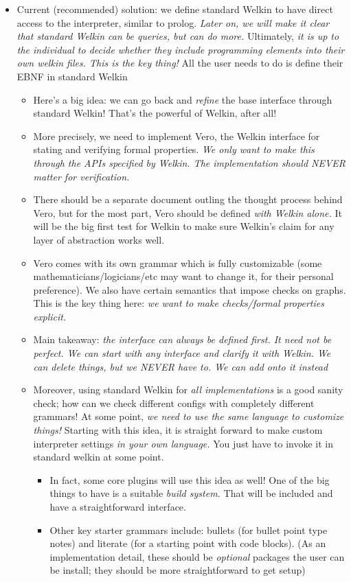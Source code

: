 \begin{itemize}
  \item Current (recommended) solution: we define standard Welkin to have direct access to the interpreter, similar to prolog. \textit{Later on, we will make it clear that standard Welkin can be queries, but can do more.} Ultimately, \textit{it is up to the individual to decide whether they include programming elements into their own welkin files. This is the key thing! } All the user needs to do is define their EBNF in standard Welkin
		\begin{itemize}
		  \item Here's a big idea: we can go back and \textit{refine} the base interface through standard Welkin! That's the powerful of Welkin, after all!
		  \item More precisely, we need to implement Vero, the Welkin interface for stating and verifying formal properties. \textit{We only want to make this through the APIs specified by Welkin. The implementation should NEVER matter for verification.}
		  \item There should be a separate document outling the thought process behind Vero, but for the most part, Vero should be defined \textit{with Welkin alone.} It will be the big first test for Welkin to make sure Welkin's claim for any layer of abstraction works well.
		\item Vero comes with its own grammar which is fully customizable (some mathematicians/logicians/etc may want to change it, for their personal preference). We also have certain semantics that impose checks on graphs. This is the key thing here: \textit{we want to make checks/formal properties explicit.}
		  \item Main takeaway: \textit{the interface can always be defined first. It need not be perfect. We can start with any interface and clarify it with Welkin. We can delete things, but we NEVER have to. We can add onto it instead}
		  \item Moreover, using standard Welkin for \textit{all implementations} is a good sanity check; how can we check different configs with completely different grammars! At some point, \textit{ we need to use the same language to customize things!} Starting with this idea, it is straight forward to make custom interpreter settings \textit{in your own language.} You just have to invoke it in standard welkin at some point.
				\begin{itemize}
				  \item In fact, some core plugins will use this idea as well! One of the big things to have is a suitable \textit{build system.} That will be included and have a straightforward interface.
				  \item Other key starter grammars include: bullets (for bullet point type notes) and literate (for a starting point with code blocks). (As an implementation detail, these should be \textit{optional} packages the user can be install; they should be more straightforward to get setup)
				\end{itemize}
		\end{itemize}


\end{itemize}

